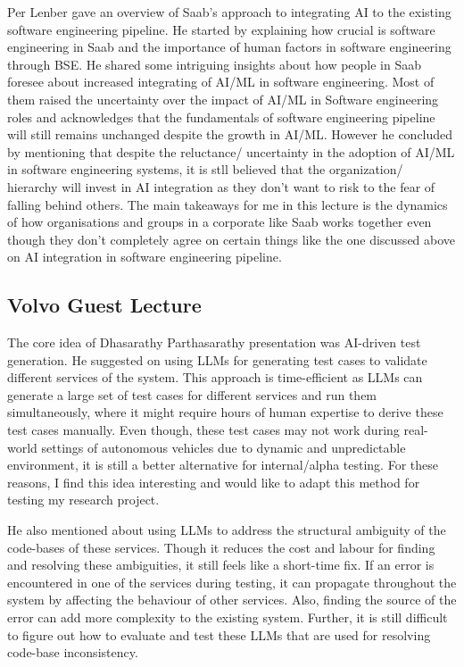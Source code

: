 \documentclass[a4paper, 11pt]{article}
\begin{document}
Per Lenber gave an overview of Saab's approach to integrating AI to the existing software engineering pipeline. He started by explaining how crucial is software engineering in Saab and the importance of human factors in software engineering through BSE. He shared some intriguing insights about how people in Saab foresee about increased integrating of AI/ML in software engineering. Most of them raised the uncertainty over the impact of AI/ML in Software engineering roles and acknowledges that the fundamentals of software engineering pipeline will still remains unchanged despite the growth in AI/ML. However he concluded by mentioning that despite the reluctance/ uncertainty in the adoption of AI/ML in software engineering systems, it is stll believed that the organization/ hierarchy will invest in AI integration as they don't want to risk to the fear of falling behind others. The main takeaways for me in this lecture is the dynamics of how organisations and groups in a corporate like Saab works together even though they don't completely agree on certain things like the one discussed above on AI integration in software engineering pipeline. 


\subsection{Volvo Guest Lecture}

The core idea of Dhasarathy Parthasarathy presentation was AI-driven test generation. He suggested on using LLMs for generating test cases to validate different services of the system. This approach is time-efficient as LLMs can generate a large set of test cases for different services and run them simultaneously, where it might require hours of human expertise to derive these test cases manually. Even though, these test cases may not work during real-world settings of autonomous vehicles due to dynamic and unpredictable environment, it is still a better alternative for internal/alpha testing. For these reasons, I find this idea interesting and would like to adapt this method for testing my research project.  

He also mentioned about using LLMs to address the structural ambiguity of the code-bases of these services. Though it reduces the cost and labour for finding and resolving these ambiguities, it still feels like a short-time fix. If an error is encountered in one of the services during testing, it can propagate throughout the system by affecting the behaviour of other services. Also, finding the source of the error can add more complexity to the existing system. Further, it is still difficult to figure out how to evaluate and test these LLMs that are used for resolving code-base inconsistency. 
\end{document}
